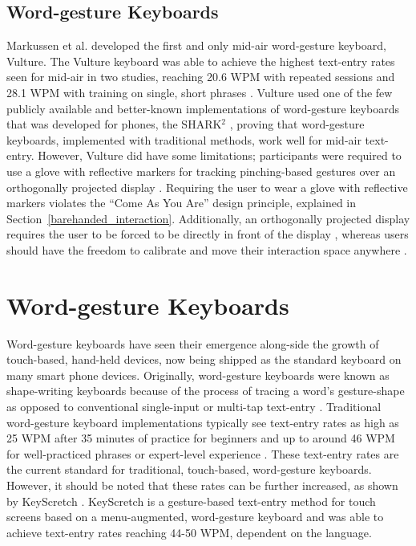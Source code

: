\subsection{Word-gesture Keyboards}
Markussen et al. \citeyear{ref_vulture} developed the first and only mid-air word-gesture keyboard, Vulture. The Vulture keyboard was able to achieve the highest text-entry rates seen for mid-air in two studies, reaching 20.6 WPM with repeated sessions and 28.1 WPM with training on single, short phrases \cite{ref_vulture}. Vulture used one of the few publicly available and better-known implementations of word-gesture keyboards that was developed for phones, the SHARK$^2$ \cite{ref_shape_writing,ref_shark_wgk}, proving that word-gesture keyboards, implemented with traditional methods, work well for mid-air text-entry. However, Vulture did have some limitations; participants were required to use a glove with reflective markers for tracking pinching-based gestures over an orthogonally projected display \cite{ref_selection_based_mid_air}. Requiring the user to wear a glove with reflective markers violates the ``Come As You Are'' design principle, explained in Section~\ref{barehanded_interaction}. Additionally, an orthogonally projected display requires the user to be forced to be directly in front of the display \cite{ref_selection_based_mid_air}, whereas users should have the freedom to calibrate and move their interaction space anywhere \cite{ref_natural_interactions}.

\section{Word-gesture Keyboards} \label{word_gesture_keyboards}
Word-gesture keyboards have seen their emergence along-side the growth of touch-based, hand-held devices, now being shipped as the standard keyboard on many smart phone devices. Originally, word-gesture keyboards were known as shape-writing keyboards because of the process of tracing a word's gesture-shape as opposed to conventional single-input or multi-tap text-entry \cite{ref_shape_writing,ref_the_word_gesture_keyboard,ref_shapewriter_iphone,ref_shark_wgk,ref_shorthand_writing}. Traditional word-gesture keyboard implementations typically see text-entry rates as high as 25 WPM after 35 minutes of practice for beginners and up to around 46 WPM for well-practiced phrases or expert-level experience \cite{ref_shape_writing,ref_theoretical_expert_speeds}. These text-entry rates are the current standard for traditional, touch-based, word-gesture keyboards. However, it should be noted that these rates can be further increased, as shown by KeyScretch \cite{ref_keyscretch}. KeyScretch is a gesture-based text-entry method for touch screens based on a menu-augmented, word-gesture keyboard and was able to achieve text-entry rates reaching 44-50 WPM, dependent on the language.

